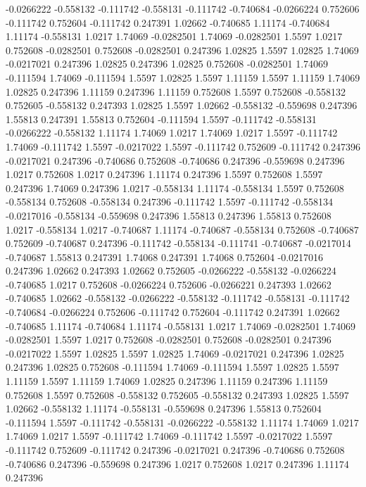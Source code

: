 -0.0266222 -0.558132
-0.111742 -0.558131
-0.111742 -0.740684
-0.0266224 0.752606
-0.111742 0.752604
-0.111742 0.247391
1.02662 -0.740685
1.11174 -0.740684
1.11174 -0.558131
1.0217 1.74069
-0.0282501 1.74069
-0.0282501 1.5597
1.0217 0.752608
-0.0282501 0.752608
-0.0282501 0.247396
1.02825 1.5597
1.02825 1.74069
-0.0217021 0.247396
1.02825 0.247396
1.02825 0.752608
-0.0282501 1.74069
-0.111594 1.74069
-0.111594 1.5597
1.02825 1.5597
1.11159 1.5597
1.11159 1.74069
1.02825 0.247396
1.11159 0.247396
1.11159 0.752608
1.5597 0.752608
-0.558132 0.752605
-0.558132 0.247393
1.02825 1.5597
1.02662 -0.558132
-0.559698 0.247396
1.55813 0.247391
1.55813 0.752604
-0.111594 1.5597
-0.111742 -0.558131
-0.0266222 -0.558132
1.11174 1.74069
1.0217 1.74069
1.0217 1.5597
-0.111742 1.74069
-0.111742 1.5597
-0.0217022 1.5597
-0.111742 0.752609
-0.111742 0.247396
-0.0217021 0.247396
-0.740686 0.752608
-0.740686 0.247396
-0.559698 0.247396
1.0217 0.752608
1.0217 0.247396
1.11174 0.247396
1.5597 0.752608
1.5597 0.247396
1.74069 0.247396
1.0217 -0.558134
1.11174 -0.558134
1.5597 0.752608
-0.558134 0.752608
-0.558134 0.247396
-0.111742 1.5597
-0.111742 -0.558134
-0.0217016 -0.558134
-0.559698 0.247396
1.55813 0.247396
1.55813 0.752608
1.0217 -0.558134
1.0217 -0.740687
1.11174 -0.740687
-0.558134 0.752608
-0.740687 0.752609
-0.740687 0.247396
-0.111742 -0.558134
-0.111741 -0.740687
-0.0217014 -0.740687
1.55813 0.247391
1.74068 0.247391
1.74068 0.752604
-0.0217016 0.247396
1.02662 0.247393
1.02662 0.752605
-0.0266222 -0.558132
-0.0266224 -0.740685
1.0217 0.752608
-0.0266224 0.752606
-0.0266221 0.247393
1.02662 -0.740685
1.02662 -0.558132
-0.0266222 -0.558132
-0.111742 -0.558131
-0.111742 -0.740684
-0.0266224 0.752606
-0.111742 0.752604
-0.111742 0.247391
1.02662 -0.740685
1.11174 -0.740684
1.11174 -0.558131
1.0217 1.74069
-0.0282501 1.74069
-0.0282501 1.5597
1.0217 0.752608
-0.0282501 0.752608
-0.0282501 0.247396
-0.0217022 1.5597
1.02825 1.5597
1.02825 1.74069
-0.0217021 0.247396
1.02825 0.247396
1.02825 0.752608
-0.111594 1.74069
-0.111594 1.5597
1.02825 1.5597
1.11159 1.5597
1.11159 1.74069
1.02825 0.247396
1.11159 0.247396
1.11159 0.752608
1.5597 0.752608
-0.558132 0.752605
-0.558132 0.247393
1.02825 1.5597
1.02662 -0.558132
1.11174 -0.558131
-0.559698 0.247396
1.55813 0.752604
-0.111594 1.5597
-0.111742 -0.558131
-0.0266222 -0.558132
1.11174 1.74069
1.0217 1.74069
1.0217 1.5597
-0.111742 1.74069
-0.111742 1.5597
-0.0217022 1.5597
-0.111742 0.752609
-0.111742 0.247396
-0.0217021 0.247396
-0.740686 0.752608
-0.740686 0.247396
-0.559698 0.247396
1.0217 0.752608
1.0217 0.247396
1.11174 0.247396
